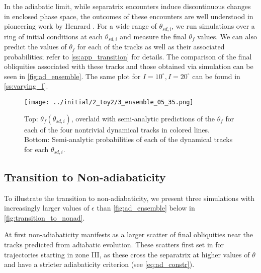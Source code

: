 \documentclass[
        fleqn,
        usenatbib,
    ]{mnras}
\newcommand*{\p}[1]{\left(#1\right)}
\begin{document}
In the adiabatic limit, while separatrix encounters induce discontinuous changes
in enclosed phase space, the outcomes of these encounters are well understood in
pioneering work by Henrard \citep{henrard1982,henrard1987}. For a wide range of
$\theta_{sd, i}$, we run simulations over a ring of initial conditions at each
$\theta_{sd, i}$ and measure the final $\theta_{ f}$ values. We can also
predict the values of $\theta_{ f}$ for each of the tracks as
well as their associated probabilities; refer to \autoref{ss:app_transition} for
details. The comparison of the final obliquities associated with these tracks
and those obtained via simulation can be seen in \autoref{fig:ad_ensemble}. The
same plot for $I = 10^\circ, I = 20^\circ$ can be found in
\autoref{ss:varying_I}.
\begin{figure}
    \centering
    \texttt{[image: ../initial/2\_toy2/3\_ensemble\_05\_35.png]}
    \caption{Top: $\theta_{f}\p{\theta_{sd, i}}$, overlaid with semi-analytic
    predictions of the $\theta_{ f}$ for each of the four nontrivial
    dynamical tracks in colored lines. Bottom: Semi-analytic probabilities of
    each of the dynamical tracks for each $\theta_{sd,
    i}$.}\label{fig:ad_ensemble}
\end{figure}

\subsection{Transition to Non-adiabaticity}

To illustrate the transition to non-adiabaticity, we present three simulations
with increasingly larger values of $\epsilon$ than \autoref{fig:ad_ensemble}
below in \autoref{fig:transition_to_nonad}.

At first non-adiabaticity manifests as a larger scatter of final obliquities
near the tracks predicted from adiabatic evolution. These scatters first set in
for trajectories starting in zone III, as these cross the separatrix at higher
values of $\theta$ and have a stricter adiabaticity criterion (see
\autoref{eq:ad_constr}).
\end{document}
